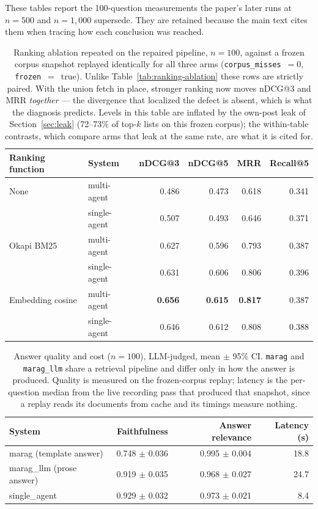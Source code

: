 \documentclass[acmsmall,anonymous,screen]{acmart}
\begin{document}
These tables report the 100-question measurements the paper's later runs at
$n=500$ and $n=1{,}000$ supersede. They are retained because the main text
cites them when tracing how each conclusion was reached.

\begin{table}[t]
\caption{Ranking ablation repeated on the repaired pipeline, $n=100$, against a
frozen corpus snapshot replayed identically for all three arms
(\texttt{corpus\_misses}~$=0$, \texttt{frozen}~$=$~true). Unlike
Table~\ref{tab:ranking-ablation} these rows are strictly paired. With the union
fetch in place, stronger ranking now moves nDCG@3 and MRR \emph{together} ---
the divergence that localized the defect is absent, which is what the diagnosis
predicts. Levels in this table are inflated by the own-post leak of
Section~\ref{sec:leak} (72--73\% of top-$k$ lists on this frozen corpus); the
within-table contrasts, which compare arms that leak at the same rate, are what
it is cited for.}
\label{tab:scaled-ablation}
\begin{tabular}{llrrrr}
\toprule
Ranking function & System & nDCG@3 & nDCG@5 & MRR & Recall@5 \\
\midrule
None            & multi-agent  & 0.486 & 0.473 & 0.618 & 0.341 \\
                & single-agent & 0.507 & 0.493 & 0.646 & 0.371 \\
Okapi BM25      & multi-agent  & 0.627 & 0.596 & 0.793 & 0.387 \\
                & single-agent & 0.631 & 0.606 & 0.806 & 0.396 \\
Embedding cosine & multi-agent  & \textbf{0.656} & \textbf{0.615} & \textbf{0.817} & 0.387 \\
                 & single-agent & 0.646 & 0.612 & 0.808 & 0.388 \\
\bottomrule
\end{tabular}
\end{table}

\begin{table}[t]
\caption{Answer quality and cost ($n=100$), LLM-judged, mean $\pm$ 95\% CI.
\texttt{marag} and \texttt{marag\_llm} share a retrieval pipeline and differ
only in how the answer is produced. Quality is measured on the frozen-corpus
replay; latency is the per-question median from the live recording pass that
produced that snapshot, since a replay reads its documents from cache and its
timings measure nothing.}
\label{tab:scaled-answer}
\begin{tabular}{lrrr}
\toprule
System & Faithfulness & Answer relevance & Latency (s) \\
\midrule
marag (template answer)   & 0.748 $\pm$ 0.036 & 0.995 $\pm$ 0.004 & 18.8 \\
marag\_llm (prose answer) & 0.919 $\pm$ 0.035 & 0.968 $\pm$ 0.027 & 24.7 \\
single\_agent             & 0.929 $\pm$ 0.032 & 0.973 $\pm$ 0.021 & 8.4 \\
\bottomrule
\end{tabular}
\end{table}
\end{document}
